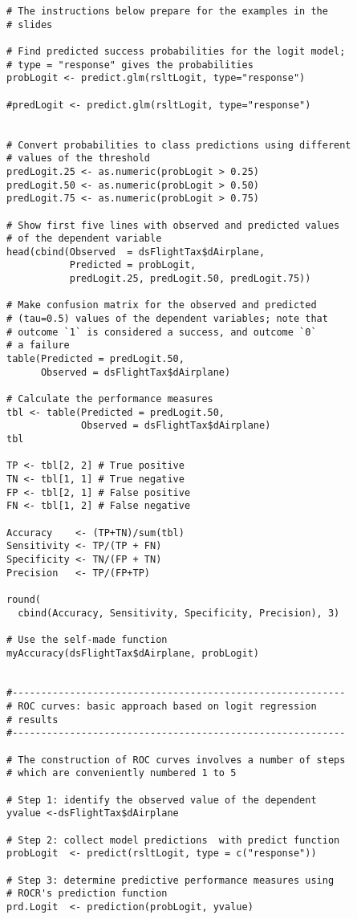\documentclass{article}
\begin{document}
\begin{tiny}
\begin{verbatim}
# The instructions below prepare for the examples in the
# slides

# Find predicted success probabilities for the logit model;
# type = "response" gives the probabilities
probLogit <- predict.glm(rsltLogit, type="response")

#predLogit <- predict.glm(rsltLogit, type="response")


# Convert probabilities to class predictions using different
# values of the threshold
predLogit.25 <- as.numeric(probLogit > 0.25)
predLogit.50 <- as.numeric(probLogit > 0.50)
predLogit.75 <- as.numeric(probLogit > 0.75)

# Show first five lines with observed and predicted values
# of the dependent variable
head(cbind(Observed  = dsFlightTax$dAirplane, 
           Predicted = probLogit,
           predLogit.25, predLogit.50, predLogit.75))

# Make confusion matrix for the observed and predicted
# (tau=0.5) values of the dependent variables; note that
# outcome `1` is considered a success, and outcome `0`
# a failure
table(Predicted = predLogit.50, 
      Observed = dsFlightTax$dAirplane)

# Calculate the performance measures
tbl <- table(Predicted = predLogit.50, 
             Observed = dsFlightTax$dAirplane)
tbl

TP <- tbl[2, 2] # True positive
TN <- tbl[1, 1] # True negative
FP <- tbl[2, 1] # False positive
FN <- tbl[1, 2] # False negative

Accuracy    <- (TP+TN)/sum(tbl)
Sensitivity <- TP/(TP + FN)
Specificity <- TN/(FP + TN)
Precision   <- TP/(FP+TP)

round(
  cbind(Accuracy, Sensitivity, Specificity, Precision), 3)

# Use the self-made function
myAccuracy(dsFlightTax$dAirplane, probLogit)


#----------------------------------------------------------
# ROC curves: basic approach based on logit regression 
# results
#----------------------------------------------------------

# The construction of ROC curves involves a number of steps
# which are conveniently numbered 1 to 5

# Step 1: identify the observed value of the dependent
yvalue <-dsFlightTax$dAirplane

# Step 2: collect model predictions  with predict function
probLogit  <- predict(rsltLogit, type = c("response"))

# Step 3: determine predictive performance measures using
# ROCR's prediction function
prd.Logit  <- prediction(probLogit, yvalue)


\end{verbatim}
\end{tiny}
\end{document}
